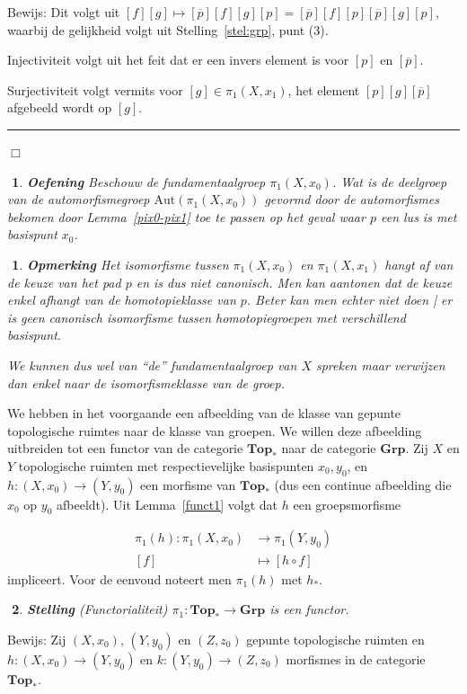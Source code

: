 \documentclass[12pt]{book}
\newcommand{\bew}{{\sc Bewijs: }}
\newcommand{\B}{\rule{1mm}{0mm} \hfill $\Box$ }
\newtheorem{stelh}{$\!\!$}[section]
\newenvironment{stel}{\begin{stelh}{\em {\bf Stelling }}}{\end{stelh}}
\newtheorem{opmh}[stelh]{$\!\!$}
\newenvironment{eopm}{\begin{opmh} \em {\bf Opmerking }}{\end{opmh}}
\newtheorem{eoef}{$\!\!$}[chapter]
\newenvironment{oef}{\begin{eoef} {\bf Oefening}}{\end{eoef}}
\begin{document}
\bew  Dit volgt uit $[f][g] \mapsto [\overline{p}][f][g][p]=[\overline{p}][f][p][\overline{p}][g][p]$, waarbij de gelijkheid volgt uit Stelling~\ref{stel:grp}, punt (3). 

Injectiviteit volgt uit het feit dat er een invers element is voor $[p]$ en $[\overline{p}]$. 

Surjectiviteit volgt vermits voor $[g]\in \pi_{1}(X,x_1)$, het element $[p][g][\overline{p}]$ afgebeeld wordt op $[g]$. 
\B


\begin{oef}
Beschouw de fundamentaalgroep $\pi_1(X,x_0)$. Wat is de deelgroep van de automorfismegroep $\mathrm{Aut}(\pi_1(X,x_0))$ gevormd door de automorfismes bekomen door Lemma~\ref{pix0-pix1} toe te passen op het geval waar $p$ een lus is met basispunt $x_0$.
\end{oef}

\begin{eopm} Het isomorfisme tussen $\pi_{1}(X,x_0)$ en $\pi_{1}(X,x_1)$ hangt af van de keuze van het pad $p$
en is dus niet canonisch. Men kan aantonen dat de keuze enkel afhangt van de homotopieklasse van
$p$. Beter kan men echter niet doen | er is geen canonisch isomorfisme tussen homotopiegroepen met
verschillend basispunt. 

We kunnen dus wel van ``de'' fundamentaalgroep van $X$ spreken maar verwijzen dan enkel naar de isomorfismeklasse van de groep.
\end{eopm}


We hebben in het voorgaande een afbeelding van de klasse van gepunte topologische ruimtes naar de klasse van groepen. We willen deze afbeelding uitbreiden tot een functor van de categorie $\mathbf{Top}_*$ naar de categorie $\mathbf{Grp}$. Zij $X$ en $Y$ topologische ruim\-ten met respectievelijke basispunten $x_0, y_0$, en $h : (X, x_0) \to (Y,y_0)$ een morfisme van $\mathbf{Top}_*$ (dus een continue afbeelding die $x_0$ op $y_0$
afbeeldt). Uit Lemma~\ref{funct1} volgt dat $h$ een groepsmorfisme 

\begin{align*}
\pi_1(h) :\pi_{1}(X,x_0) &\to \pi_{1}(Y,y_0) \\
[f] &\mapsto [h\circ f]
\end{align*}
impliceert. Voor de eenvoud noteert men $\pi_1(h)$ met $h_*$.

\begin{stel} {\rm (Functorialiteit)} \label{functor1} $\pi_1: \mathbf{Top}_* \to \mathbf{Grp}$ is een functor.
\end{stel}
\bew
Zij $(X,x_0)$, $(Y,y_0)$ en $(Z,z_0)$ gepunte topologische ruimten en $h: (X,x_0) \to (Y,y_0)$ en $k : (Y,y_0) \to (Z,z_0)$ morfismes in de categorie $\mathbf{Top}_*$.
\end{document}
